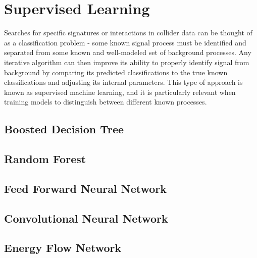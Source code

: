 \section{Supervised Learning}
\label{sec:supervised}
Searches for specific signatures or interactions in collider data can be thought of as a classification problem - some known signal process must be identified and separated from some known and well-modeled set of background processes. Any iterative algorithm can then improve its ability to properly identify signal from background by comparing its predicted classifications to the true known classifications and adjusting its internal parameters. This type of approach is known as supervised machine learning, and it is particularly relevant when training models to distinguish between different known processes.

\subsection{Boosted Decision Tree}


\subsection{Random Forest}


\subsection{Feed Forward Neural Network}


\subsection{Convolutional Neural Network}



%

\subsection{Energy Flow Network}

